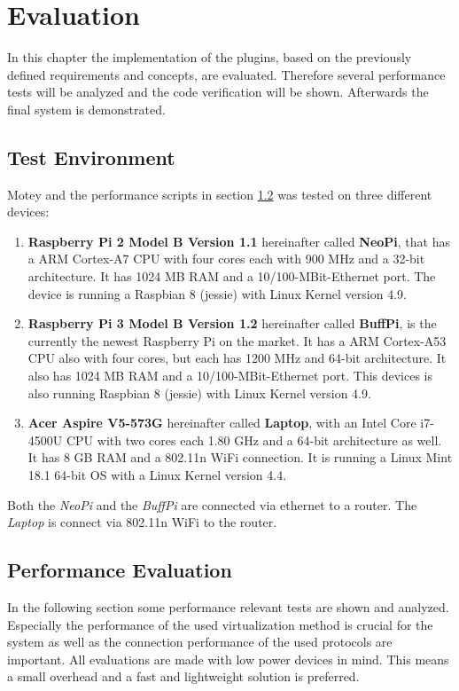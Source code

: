 \chapter{Evaluation}
\label{chapter:evaluation}
\minitoc\vspace{.5cm}
In this chapter the implementation of the plugins, based on the previously defined requirements and concepts, are evaluated.
Therefore several performance tests will be analyzed and the code verification will be shown.
Afterwards the final system is demonstrated.

\section{Test Environment}
\label{section:test-environment}
Motey and the performance scripts in section \ref{section:performance-evaluation} was tested on three different devices:

\begin{enumerate}
  \item \textbf{Raspberry Pi 2 Model B Version 1.1} hereinafter called \textbf{NeoPi}, that has a ARM Cortex-A7 \ac{CPU} with four cores each with 900 MHz and a 32-bit architecture. It has 1024 MB \ac{RAM} and a 10/100-MBit-Ethernet port. The device is running a Raspbian 8 (jessie) with Linux Kernel version 4.9.
  \item \textbf{Raspberry Pi 3 Model B Version 1.2} hereinafter called \textbf{BuffPi}, is the currently the newest Raspberry Pi on the market. It has a ARM Cortex-A53 \ac{CPU} also with four cores, but each has 1200 MHz and 64-bit architecture. It also has 1024 MB \ac{RAM} and a 10/100-MBit-Ethernet port.  This devices is also running Raspbian 8 (jessie) with Linux Kernel version 4.9.
  \item \textbf{Acer Aspire V5-573G} hereinafter called \textbf{Laptop}, with an Intel Core i7-4500U \ac{CPU} with two cores each 1.80 GHz and a 64-bit architecture as well. It has 8 GB \ac{RAM} and a 802.11n WiFi connection. It is running a Linux Mint 18.1  64-bit \ac{OS} with a Linux Kernel version 4.4.
\end{enumerate}
\bigskip

Both the \textit{NeoPi} and the \textit{BuffPi} are connected via ethernet to a router.
The \textit{Laptop} is connect via 802.11n WiFi to the router.

\section{Performance Evaluation}
\label{section:performance-evaluation}
In the following section some performance relevant tests are shown and analyzed.
Especially the performance of the used virtualization method is crucial for the system as well as the connection performance of the used protocols are important.
All evaluations are made with low power devices in mind.
This means a small overhead and a fast and lightweight solution is preferred.


